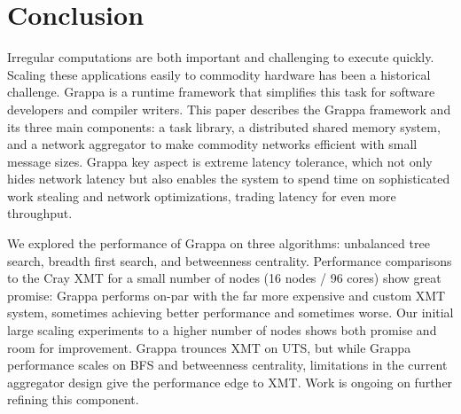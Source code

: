 \section{Conclusion}

Irregular computations are both important and challenging to execute quickly.
Scaling these applications easily to commodity hardware has been a historical
challenge. Grappa is a runtime framework that simplifies this task for
software developers and compiler writers. This paper describes the Grappa
framework and its three main components: a task library, a distributed shared
memory system, and a network aggregator to make commodity networks efficient
with small message sizes. Grappa key aspect is extreme latency tolerance,
which not only hides network latency but also enables the system to spend time
on sophisticated work stealing and network optimizations, trading latency for
even more throughput.

We explored the performance of Grappa on three algorithms: unbalanced tree
search, breadth first search, and betweenness centrality. Performance
comparisons to the Cray XMT for a small number of nodes (16 nodes / 96 cores)
show great promise: Grappa performs on-par with the far more expensive and
custom XMT system, sometimes achieving better performance and sometimes worse.
Our initial large scaling experiments to a higher number of nodes shows both promise and room for improvement.  Grappa trounces XMT on UTS, but while Grappa performance scales on BFS and betweenness centrality, limitations in the current aggregator design give the performance edge to XMT.  Work is ongoing on further refining this component.